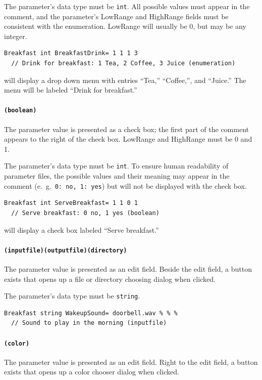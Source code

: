 \documentclass[letterpaper,oneside,12pt]{book}
\begin{document}
The parameter's data type must be \texttt{int}.
All possible values must appear in the comment, and the parameter's LowRange and HighRange 
fields must be consistent with the enumeration. LowRange will usually be 0, but may be any
integer.
\begin{verbatim}
Breakfast int BreakfastDrink= 1 1 1 3
  // Drink for breakfast: 1 Tea, 2 Coffee, 3 Juice (enumeration)
\end{verbatim}
will display a drop down menu with entries ``Tea,'' ``Coffee,'', and ``Juice.''
The menu will be labeled ``Drink for breakfast.''

\paragraph{\texttt{(boolean)}}
The parameter value is presented as a check box; the first part of the comment appears
to the right of the check box. LowRange and HighRange must be 0 and 1.

The parameter's data type must be \texttt{int}.
To ensure human readability of parameter files, the possible values and their meaning may 
appear in the comment (e.\ g.\ \texttt{0:\ no, 1:\ yes}) but will not be displayed with the 
check box.
\begin{verbatim}
Breakfast int ServeBreakfast= 1 1 0 1
  // Serve breakfast: 0 no, 1 yes (boolean)
\end{verbatim}
will display a check box labeled ``Serve breakfast.''

\paragraph{\texttt{(inputfile)(outputfile)(directory)}}
The parameter value is presented as an edit field. Beside the edit field, a button
exists that opens up a file or directory choosing dialog when clicked.

The parameter's data type must be \texttt{string}.
\begin{verbatim}
Breakfast string WakeupSound= doorbell.wav % % %
  // Sound to play in the morning (inputfile)
\end{verbatim}

\paragraph{\texttt{(color)}}
The parameter value is presented as an edit field. Right to the edit field, a button
exists that opens up a color chooser dialog when clicked.
\end{document}
